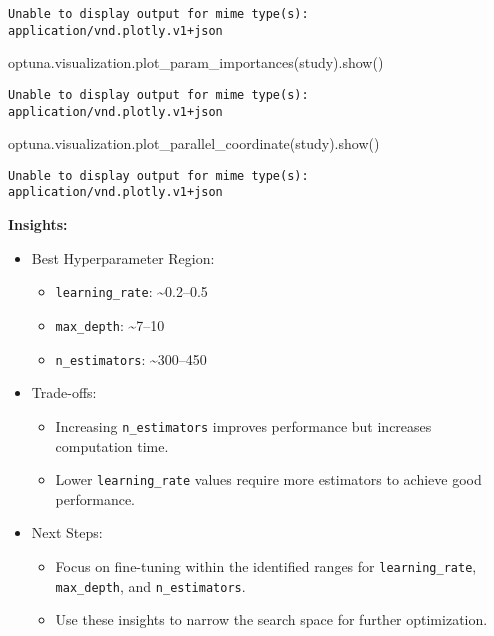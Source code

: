 \documentclass[
  letterpaper,
  DIV=11,
  numbers=noendperiod]{scrreprt}
\newenvironment{Shaded}{\begin{snugshade}}{\end{snugshade}}
\newcommand{\NormalTok}[1]{\textcolor[rgb]{0.00,0.23,0.31}{#1}}
\providecommand{\tightlist}{%
  \setlength{\itemsep}{0pt}\setlength{\parskip}{0pt}}\usepackage{longtable,booktabs,array}
\begin{document}
\begin{verbatim}
Unable to display output for mime type(s): application/vnd.plotly.v1+json
\end{verbatim}

\begin{Shaded}
\begin{Highlighting}[]
\NormalTok{optuna.visualization.plot\_param\_importances(study).show()}
\end{Highlighting}
\end{Shaded}

\begin{verbatim}
Unable to display output for mime type(s): application/vnd.plotly.v1+json
\end{verbatim}

\begin{Shaded}
\begin{Highlighting}[]
\NormalTok{optuna.visualization.plot\_parallel\_coordinate(study).show()}
\end{Highlighting}
\end{Shaded}

\begin{verbatim}
Unable to display output for mime type(s): application/vnd.plotly.v1+json
\end{verbatim}

\textbf{Insights:}

\begin{itemize}
\item
  Best Hyperparameter Region:

  \begin{itemize}
  \tightlist
  \item
    \texttt{learning\_rate}: \textasciitilde0.2--0.5
  \item
    \texttt{max\_depth}: \textasciitilde7--10
  \item
    \texttt{n\_estimators}: \textasciitilde300--450
  \end{itemize}
\item
  Trade-offs:

  \begin{itemize}
  \tightlist
  \item
    Increasing \texttt{n\_estimators} improves performance but increases
    computation time.
  \item
    Lower \texttt{learning\_rate} values require more estimators to
    achieve good performance.
  \end{itemize}
\item
  Next Steps:

  \begin{itemize}
  \tightlist
  \item
    Focus on fine-tuning within the identified ranges for
    \texttt{learning\_rate}, \texttt{max\_depth}, and
    \texttt{n\_estimators}.
  \item
    Use these insights to narrow the search space for further
    optimization.
  \end{itemize}
\end{itemize}
\end{document}
